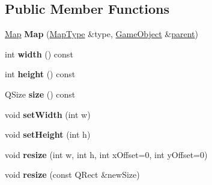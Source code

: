 \subsection*{\-Public \-Member \-Functions}
\begin{DoxyCompactItemize}
\item 
\hypertarget{class_map_a309fe60658ede796d53d9df6752da597}{\hyperlink{class_map}{\-Map} {\bfseries \-Map} (\hyperlink{class_map_type}{\-Map\-Type} \&type, \hyperlink{class_game_object}{\-Game\-Object} \&\hyperlink{class_game_object_af3deaf39cde23c189765634e32e95bb4}{parent})}\label{class_map_a309fe60658ede796d53d9df6752da597}

\item 
\hypertarget{class_map_a4c35169a60acd3669f198e6c2d20dff5}{int {\bfseries width} () const }\label{class_map_a4c35169a60acd3669f198e6c2d20dff5}

\item 
\hypertarget{class_map_a009f197c2e488d8dd5f02b1a2920a15c}{int {\bfseries height} () const }\label{class_map_a009f197c2e488d8dd5f02b1a2920a15c}

\item 
\hypertarget{class_map_a028c347d88716e984c943f382f58b7ef}{\-Q\-Size {\bfseries size} () const }\label{class_map_a028c347d88716e984c943f382f58b7ef}

\item 
\hypertarget{class_map_a2915ccde4d8a2ba8142677baea803467}{void {\bfseries set\-Width} (int w)}\label{class_map_a2915ccde4d8a2ba8142677baea803467}

\item 
\hypertarget{class_map_affab3537641a7985559f83ea083e00ca}{void {\bfseries set\-Height} (int h)}\label{class_map_affab3537641a7985559f83ea083e00ca}

\item 
\hypertarget{class_map_ac52cae7055ef71e9078008f26e61d51c}{void {\bfseries resize} (int w, int h, int x\-Offset=0, int y\-Offset=0)}\label{class_map_ac52cae7055ef71e9078008f26e61d51c}

\item 
\hypertarget{class_map_a2adf6683fb6de126c391512d180789b2}{void {\bfseries resize} (const \-Q\-Rect \&new\-Size)}\label{class_map_a2adf6683fb6de126c391512d180789b2}


\end{DoxyCompactItemize}
